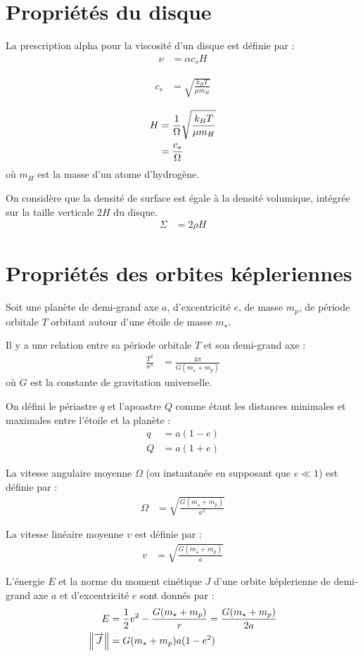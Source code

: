 \section{Propriétés du disque}

La prescription alpha pour la viscosité d'un disque est définie par :
\begin{align}
\nu &= \alpha c_s H
\end{align}

\begin{align}
c_s &= \sqrt{\frac{k_B T}{\mu m_H}}
\end{align}

\begin{align}
H &= \frac{1}{\Omega}\sqrt{\frac{k_B T}{\mu m_H}}\\
&= \frac{c_s}{\Omega}
\end{align}
où $m_H$ est la masse d'un atome d'hydrogène.

On considère que la densité de surface est égale à la densité volumique, intégrée sur la taille verticale $2H$ du disque. 
\begin{align}
\Sigma &= 2\rho H
\end{align}

\section{Propriétés des orbites képleriennes}
Soit une planète de demi-grand axe $a$, d'excentricité $e$, de masse $m_p$, de période orbitale $T$ orbitant autour d'une étoile de masse $m_\star$. 

Il y a une relation entre sa période orbitale $T$ et son demi-grand axe :
\begin{align}
\frac{T^2}{a^3} &= \frac{4\pi}{G(m_\star + m_p)}
\end{align}
où $G$ est la constante de gravitation universelle.

On défini le périastre $q$ et l'apoastre $Q$ comme étant les distances minimales et maximales entre l'étoile et la planète : 
\begin{subequations}
\begin{align}
q &= a (1 - e)\\
Q &= a (1 + e)
\end{align}
\end{subequations}

La vitesse angulaire moyenne $\Omega$ (ou instantanée en supposant que $e\ll 1$) est définie par : 
\begin{align}
\Omega &= \sqrt{\frac{G(m_\star + m_p)}{a^3}}
\end{align}

La vitesse linéaire moyenne $v$ est définie par : 
\begin{align}
v &= \sqrt{\frac{G(m_\star + m_p)}{a}}
\end{align}

L'énergie $E$ et la norme du moment cinétique $J$ d'une orbite képlerienne de demi-grand axe $a$ et d'excentricité $e$ sont donnés par :
\begin{align}
E &= \frac{1}{2}v^2 - \frac{G(m_\star + m_p)}{r} = \frac{G(m_\star + m_p)}{2a}\\
\left\|{\overrightarrow{J}}\right\| &= G(m_\star + m_p) a (1-e^2)
\end{align}
